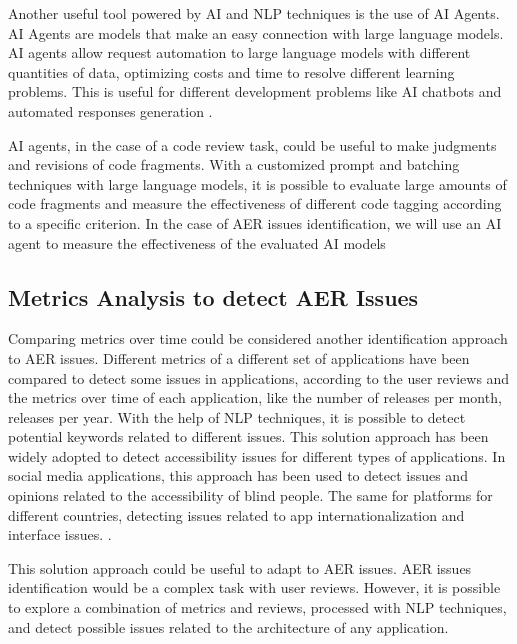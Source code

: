 Another useful tool powered by AI and NLP techniques is the use of AI Agents. AI Agents are models that make an easy connection with large language models. AI agents allow request automation to large language models with different quantities of data, optimizing costs and time to resolve different learning problems. This is useful for different development problems like AI chatbots and automated responses generation \cite{AI_agents_reference}.

AI agents, in the case of a code review task, could be useful to make judgments and revisions of code fragments. With a customized prompt and batching techniques with large language models, it is possible to evaluate large amounts of code fragments and measure the effectiveness of different code tagging according to a specific criterion. In the case of AER issues identification, we will use an AI agent to measure the effectiveness of the evaluated AI models


\subsection{Metrics Analysis to detect AER Issues}
Comparing metrics over time could be considered another identification approach to AER issues. Different metrics of a different set of applications have been compared to detect some issues in applications, according to the user reviews and the metrics over time of each application, like the number of releases per month, releases per year. With the help of NLP techniques, it is possible to detect potential keywords related to different issues. This solution approach has been widely adopted to detect accessibility issues for different types of applications. In social media applications, this approach has been used to detect issues and opinions related to the accessibility of blind people. The same for platforms for different countries, detecting issues related to app internationalization and interface issues.  \cite{accesibility_issues_metrics_tatiana}.

This solution approach could be useful to adapt to AER issues. AER issues identification would be a complex task with user reviews. However, it is possible to explore a combination of metrics and reviews, processed with NLP techniques, and detect possible issues related to the architecture of any application.









